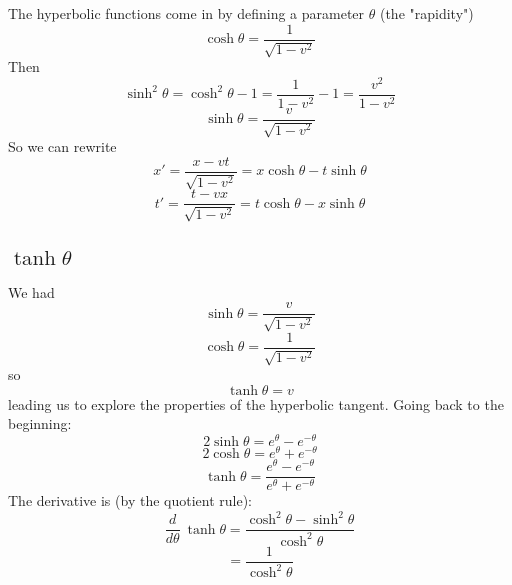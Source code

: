 \documentclass[11pt, oneside]{article}
\begin{document}
The hyperbolic functions come in by defining a parameter $\theta$ (the "rapidity")
\[ \cosh \theta = \frac{1}{\sqrt{1-v^2}} \]
Then
\[ \sinh^2 \theta = \cosh^2 \theta - 1 = \frac{1}{1-v^2} - 1 = \frac{v^2}{1-v^2} \]
\[ \sinh \theta =  \frac{v}{\sqrt{1-v^2}} \]
So we can rewrite
\[ x' = \frac{x - vt}{\sqrt{1-v^2}} = x \cosh \theta - t \sinh \theta \]
\[ t' = \frac{t - vx}{\sqrt{1-v^2}} = t \cosh \theta - x \sinh \theta  \]

\subsection*{$\tanh \theta$}
We had
\[ \sinh \theta =  \frac{v}{\sqrt{1-v^2}} \]
\[ \cosh \theta = \frac{1}{\sqrt{1-v^2}} \]
so 
\[ \tanh \theta = v \]
leading us to explore the properties of the hyperbolic tangent.  Going back to the beginning:
\[ 2 \sinh \theta = e^{\theta} -  e^{-\theta} \]
\[ 2 \cosh \theta = e^{\theta} +  e^{-\theta}  \]
\[ \tanh \theta = \frac{e^{\theta} -  e^{-\theta}}{e^{\theta} +  e^{-\theta}} \]
The derivative is (by the quotient rule):
\[ \frac{d}{d\theta} \ \tanh \theta = \frac{\cosh^2 \theta - \sinh^2 \theta}{\cosh^2 \theta}  \]
\[ =  \frac{1}{\cosh^2 \theta}  \]
\end{document}
